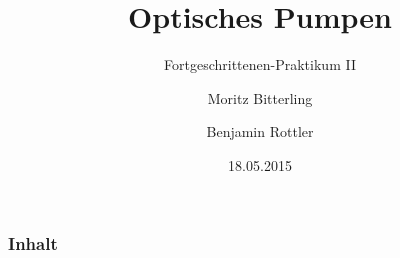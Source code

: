 \documentclass{beamer}
\title{Optisches Pumpen}
\subtitle{Fortgeschrittenen-Praktikum II}
\author{Moritz Bitterling \and Benjamin Rottler}
\institute[Universities of]{Universität Freiburg}
\date{18.05.2015}
\begin{document}
\begin{frame}
\titlepage
\end{frame}

\begin{frame}
\frametitle{Inhalt}
\tableofcontents[hideallsubsections]
\end{frame}


%





%
\end{document}
